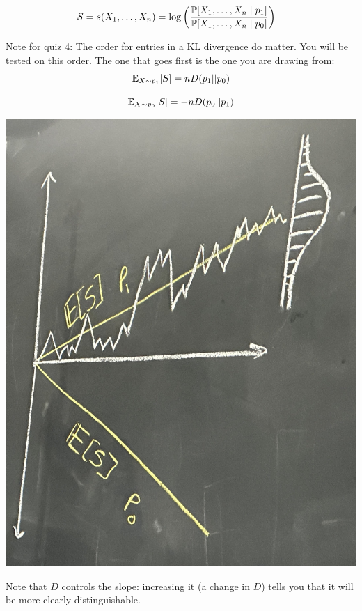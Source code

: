 \begin{align*}
S &= s(X_1, \ldots, X_n) = \log\left(\frac{\P[X_1, \ldots, X_n \mid p_1]}{\P[X_1, \ldots, X_n \mid p_0]}\right)
\end{align*}
\begin{important}
Note for quiz 4: The order for entries in a KL divergence do matter. You will be tested on this order. The one that goes first is the one you are drawing from:
\begin{equation}
    \E_{X\sim p_1}[S] = n D(p_1||p_0)
\end{equation}

\begin{equation}
    \E_{X\sim p_0}[S] = -n D(p_0||p_1)
\end{equation}
\end{important}
\begin{center}
    \includegraphics[scale=0.1]{lectures/wk8/img/img1.jpeg}
\end{center}
Note that $D$ controls the slope: increasing it (a change in $D$) tells you that it will be more clearly distinguishable.

